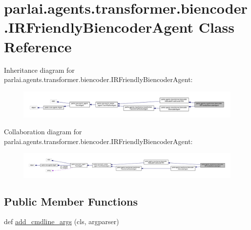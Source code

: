 \hypertarget{classparlai_1_1agents_1_1transformer_1_1biencoder_1_1IRFriendlyBiencoderAgent}{}\section{parlai.\+agents.\+transformer.\+biencoder.\+I\+R\+Friendly\+Biencoder\+Agent Class Reference}
\label{classparlai_1_1agents_1_1transformer_1_1biencoder_1_1IRFriendlyBiencoderAgent}


Inheritance diagram for parlai.\+agents.\+transformer.\+biencoder.\+I\+R\+Friendly\+Biencoder\+Agent\+:
\nopagebreak
\begin{figure}[H]
\begin{center}
\leavevmode
\includegraphics[width=350pt]{classparlai_1_1agents_1_1transformer_1_1biencoder_1_1IRFriendlyBiencoderAgent__inherit__graph}
\end{center}
\end{figure}


Collaboration diagram for parlai.\+agents.\+transformer.\+biencoder.\+I\+R\+Friendly\+Biencoder\+Agent\+:
\nopagebreak
\begin{figure}[H]
\begin{center}
\leavevmode
\includegraphics[width=350pt]{classparlai_1_1agents_1_1transformer_1_1biencoder_1_1IRFriendlyBiencoderAgent__coll__graph}
\end{center}
\end{figure}
\subsection*{Public Member Functions}
\begin{DoxyCompactItemize}
\item 
def \hyperlink{classparlai_1_1agents_1_1transformer_1_1biencoder_1_1IRFriendlyBiencoderAgent_a8ad3444ddd1002990ce5472fa1ec72bf}{add\+\_\+cmdline\+\_\+args} (cls, argparser)
\end{DoxyCompactItemize}
